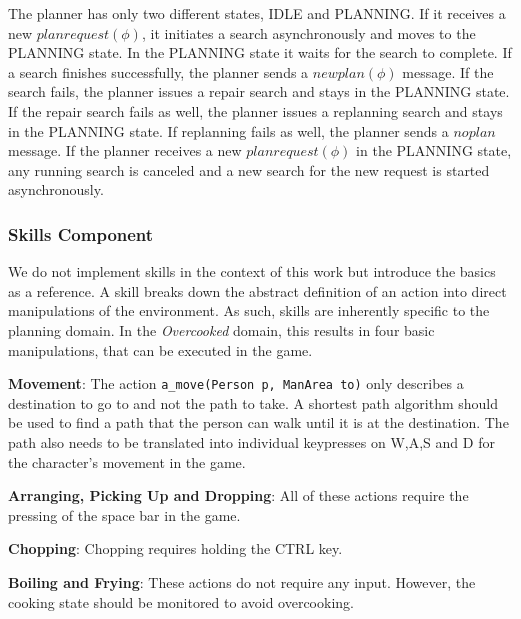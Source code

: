 The planner has only two different states, IDLE and PLANNING.
If it receives a new $planrequest(\phi)$, it initiates a search asynchronously and moves to the PLANNING state.
In the PLANNING state it waits for the search to complete.
If a search finishes successfully, the planner sends a $newplan(\phi)$ message.
If the search fails, the planner issues a repair search and stays in the PLANNING state.
If the repair search fails as well, the planner issues a replanning search and stays in the PLANNING state.
If replanning fails as well, the planner sends a $noplan$ message.
If the planner receives a new $planrequest(\phi)$ in the PLANNING state, any running search is canceled and a new search for the new request is started asynchronously.

\subsubsection{Skills Component}

We do not implement skills in the context of this work but introduce the basics as a reference.
A skill breaks down the abstract definition of an action into direct manipulations of the environment.
As such, skills are inherently specific to the planning domain.
In the \textit{Overcooked} domain, this results in four basic manipulations, that can be executed in the game.

\textbf{Movement}: The action \verb|a_move(Person p, ManArea to)| only describes a destination to go to and not the path to take. 
A shortest path algorithm should be used to find a path that the person can walk until it is at the destination. 
The path also needs to be translated into individual keypresses on W,A,S and D for the character's movement in the game.

\textbf{Arranging, Picking Up and Dropping}: All of these actions require the pressing of the space bar in the game.

\textbf{Chopping}: Chopping requires holding the CTRL key.

\textbf{Boiling and Frying}: These actions do not require any input. 
However, the cooking state should be monitored to avoid overcooking.





